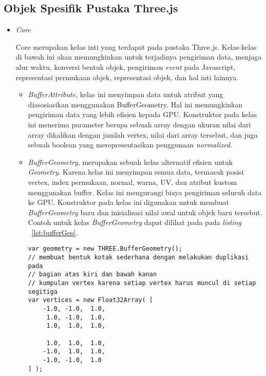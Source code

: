 \subsection{Objek Spesifik Pustaka Three.js}

\begin{itemize}

	\item \textit{Core}
	
	Core merupakan kelas inti yang terdapat pada pustaka Three.js. Kelas-kelas di bawah ini akan memungkinkan untuk terjadinya pengiriman data, menjaga alur waktu, konversi bentuk objek, pengiriman {\it event} pada Javascript, representasi permukaan objek, representasi objek, dan hal inti lainnya.
	
	\begin{itemize}
		\item{\it BufferAttribute}, kelas ini menyimpan data untuk atribut yang diasosiasikan menggunakan BufferGeometry. Hal ini memungkinkan pengiriman data yang lebih efisien kepada GPU. Konstruktor pada kelas ini menerima parameter berupa sebuah array dengan ukuran nilai dari array dikalikan dengan jumlah vertex, nilai dari array tersebut, dan juga sebuah boolean yang merepresentasikan penggunaan {\it normalized}.
		\item{\it BufferGeometry}, merupakan sebuah kelas alternatif efisien untuk {\it Geometry}. Karena kelas ini menyimpan semua data, termasuk posisi vertex, index permukaan, normal, warna, UV, dan atribut kustom menggunakan buffer. Kelas ini mengurangi biaya pengiriman seluruh data ke GPU. Konstruktor pada kelas ini digunakan untuk membuat {\it BufferGeometry} baru dan inisialisasi nilai awal untuk objek baru tersebut. Contoh untuk kelas {\it BufferGeometry} dapat dilihat pada pada {\it listing} ~\ref{lst:bufferGeo}.
\begin{lstlisting}[caption={Contoh instansiasi kelas {\it BufferGeometry} dengan membuat bentuk kotak sederhana.}, label={lst:bufferGeo},captionpos=b]
var geometry = new THREE.BufferGeometry();
// membuat bentuk kotak sederhana dengan melakukan duplikasi pada
// bagian atas kiri dan bawah kanan
// kumpulan vertex karena setiap vertex harus muncul di setiap segitiga
var vertices = new Float32Array( [
	-1.0, -1.0,  1.0,
	 1.0, -1.0,  1.0,
	 1.0,  1.0,  1.0,

	 1.0,  1.0,  1.0,
	-1.0,  1.0,  1.0,
	-1.0, -1.0,  1.0
] );


\end{lstlisting}
\end{itemize}
\end{itemize}
